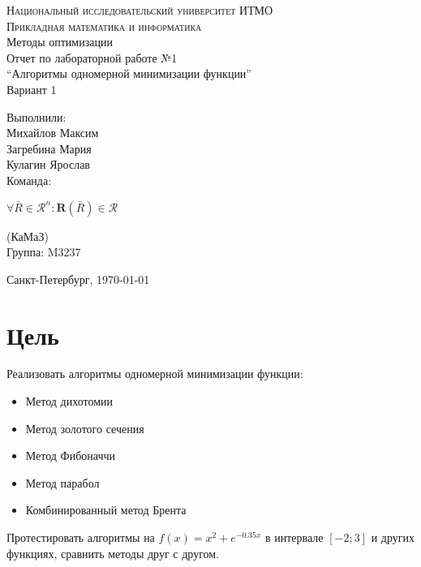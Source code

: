 





\begin{titlepage}
    \begin{center}
        \textsc{Национальный исследовательский университет ИТМО\\
            Прикладная математика и информатика}\\[5cm]

        \huge{Методы оптимизации\\[6mm]
            \large Отчет по лабораторной работе №1\\
            ``Алгоритмы одномерной минимизации функции''\\[6mm]
            Вариант 1
            \\[3cm]
        }
    \end{center}

    \begin{flushright}
        \begin{minipage}{0.25\textwidth}
            Выполнили:\\[2mm]
            Михайлов Максим\\
            Загребина Мария\\
            Кулагин Ярослав\\[2mm]
            Команда:

            \(\forall \bar R \in \mathscr{R}^n : \mathrm{\textbf{R}}(\bar R) \in \mathscr{R}\)

            (КаМаЗ)\\[2mm]
            Группа: M3237
        \end{minipage}
    \end{flushright}

    \vfill
    \begin{center}
        Санкт-Петербург, \today
    \end{center}
\end{titlepage}





\section{Цель}
Реализовать алгоритмы одномерной минимизации функции:
\begin{itemize}
    \item Метод дихотомии
    \item Метод золотого сечения
    \item Метод Фибоначчи
    \item Метод парабол
    \item Комбинированный метод Брента
\end{itemize}
Протестировать алгоритмы на \(f(x) = x^2 + e^{-0.35x}\) в интервале \([-2; 3]\) и других функциях, сравнить методы друг с другом.




